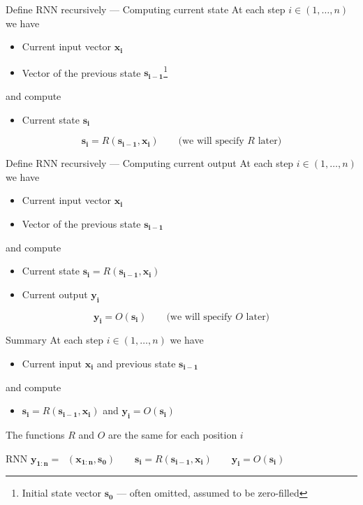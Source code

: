 \documentclass[12pt,aspectratio=169,handout]{beamer}
\DeclareMathOperator*{\rnnstar}{RNN^{*}}
\begin{document}
\begin{frame}{Define RNN recursively --- Computing current state}
At each step $i \in (1, \ldots, n)$ we have
\begin{itemize}
	\item Current input vector $\bm{x_i}$
	\item Vector of the previous state $\bm{s_{i - 1}}$\footnote{Initial state vector $\bm{s_0}$ --- often omitted, assumed to be zero-filled}
\end{itemize}
and compute
\begin{itemize}
	\item Current state $\bm{s_i}$
\end{itemize}
$$
\bm{s_i} = R(\bm{s_{i-1}}, \bm{x_i}) \qquad \text{(we will specify $R$ later)}
$$

\end{frame}


\begin{frame}{Define RNN recursively --- Computing current output}
At each step $i \in (1, \ldots, n)$ we have
\begin{itemize}
	\item Current input vector $\bm{x_i}$
	\item Vector of the previous state $\bm{s_{i - 1}}$
\end{itemize}
and compute
\begin{itemize}
	\item Current state $\bm{s_i} = R(\bm{s_{i-1}}, \bm{x_i})$
	\item Current output $\bm{y_i}$
\end{itemize}
$$
\bm{y_i} = O(\bm{s_i}) \qquad \text{(we will specify $O$ later)}
$$

\end{frame}


\begin{frame}{Summary}
At each step $i \in (1, \ldots, n)$ we have
\begin{itemize}
	\item Current input $\bm{x_i}$ and previous state $\bm{s_{i - 1}}$
\end{itemize}
and compute
\begin{itemize}
	\item $\bm{s_i} = R(\bm{s_{i-1}}, \bm{x_i})$ and $\bm{y_i}  = O(\bm{s_i})$
\end{itemize}

The functions $R$ and $O$ are the same for each position $i$

\begin{block}{RNN}
$\bm{y_{1:n}} = \rnnstar (\bm{x_{1:n}}, \bm{s_0})
\qquad
\bm{s_i} = R(\bm{s_{i-1}}, \bm{x_i})
\qquad
\bm{y_i}  = O(\bm{s_i})$
\end{block}


\end{frame}
\end{document}
